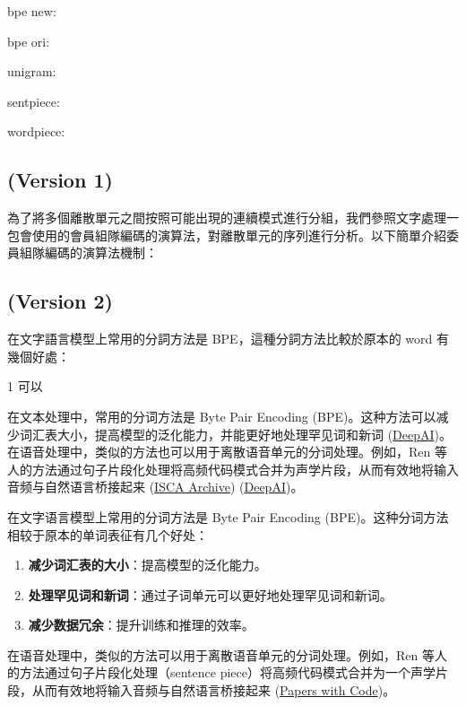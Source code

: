 
bpe new: \cite{sennrich_neural_2016}

bpe ori: \cite{10.5555/177910.177914}

unigram: \cite{kudo2018subword}

sentpiece: \cite{kudo_sentencepiece_2018}

wordpiece: \cite{wu2016google}



\subsection{(Version 1)}

為了將多個離散單元之間按照可能出現的連續模式進行分組，我們參照文字處理一包會使用的會員組隊編碼的演算法，對離散單元的序列進行分析。以下簡單介紹委員組隊編碼的演算法機制：





\myhline
\subsection{(Version 2)}


在文字語言模型上常用的分詞方法是 BPE，這種分詞方法比較於原本的 word 有幾個好處：

1 可以


 在文本处理中，常用的分词方法是 Byte Pair Encoding (BPE)。这种方法可以减少词汇表大小，提高模型的泛化能力，并能更好地处理罕见词和新词 (\href{https://deepai.org/publication/speech-pre-training-with-acoustic-piece}{DeepAI})。在语音处理中，类似的方法也可以用于离散语音单元的分词处理。例如，Ren 等人的方法通过句子片段化处理将高频代码模式合并为声学片段，从而有效地将输入音频与自然语言桥接起来 (\href{https://www.isca-archive.org/interspeech_2022/ren22_interspeech.html}{ISCA Archive}) (\href{https://deepai.org/publication/speech-pre-training-with-acoustic-piece}{DeepAI})。 




在文字语言模型上常用的分词方法是 Byte Pair Encoding (BPE)。这种分词方法相较于原本的单词表征有几个好处：

\begin{enumerate}
    \item \textbf{减少词汇表的大小}：提高模型的泛化能力。
    \item \textbf{处理罕见词和新词}：通过子词单元可以更好地处理罕见词和新词。
    \item \textbf{减少数据冗余}：提升训练和推理的效率。
\end{enumerate}
在语音处理中，类似的方法可以用于离散语音单元的分词处理。例如，Ren 等人的方法通过句子片段化处理（sentence piece）将高频代码模式合并为一个声学片段，从而有效地将输入音频与自然语言桥接起来 (\href{https://paperswithcode.com/paper/speech-pre-training-with-acoustic-piece}{Papers with Code})。

